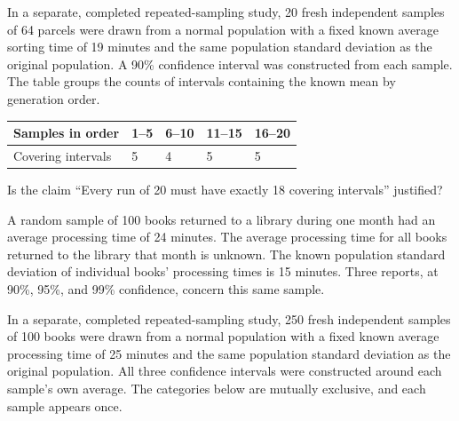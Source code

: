 In a separate, completed repeated-sampling study, 20 fresh independent samples of 64 parcels were drawn from a normal population with a fixed known average sorting time of 19 minutes and the same population standard deviation as the original population. A 90\% confidence interval was constructed from each sample. The table groups the counts of intervals containing the known mean by generation order.

\begin{center}\begin{tabular}{@{}lllll@{}}\toprule
Samples in order & 1--5 & 6--10 & 11--15 & 16--20\\\midrule
Covering intervals & 5 & 4 & 5 & 5\\
\bottomrule\end{tabular}\end{center}


\BlankInformationTable
\clearpage
{}

Is the claim ``Every run of 20 must have exactly 18 covering intervals'' justified?

\workspace{1.5in}
\vfill

\clearpage
{}
A random sample of 100 books returned to a library during one month had an average processing time of 24 minutes. The average processing time for all books returned to the library that month is unknown. The known population standard deviation of individual books' processing times is 15 minutes. Three reports, at 90\%, 95\%, and 99\% confidence, concern this same sample.

In a separate, completed repeated-sampling study, 250 fresh independent samples of 100 books were drawn from a normal population with a fixed known average processing time of 25 minutes and the same population standard deviation as the original population. All three confidence intervals were constructed around each sample's own average. The categories below are mutually exclusive, and each sample appears once.

